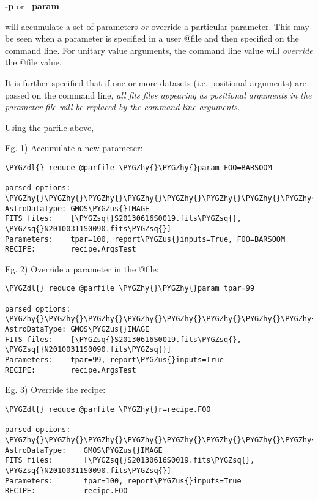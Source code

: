 \documentclass[letterpaper,10pt,english]{sphinxmanual}
\def\PYGZus{\char`\_}
\def\PYGZdl{\char`\$}
\def\PYGZhy{\char`\-}
\def\PYGZsq{\char`\'}
\begin{document}
\textbf{-p} or \textbf{--param}

will accumulate a set of parameters \emph{or} override a particular parameter.
This may be seen when a parameter is specified in a user @file and then
specified on the command line. For unitary value arguments, the command line
value will \emph{override} the @file value.

It is further specified that if one or more datasets (i.e. positional arguments)
are passed on the command line, \emph{all fits files appearing as positional arguments}
\emph{in the parameter file will be replaced by the command line arguments.}

Using the parfile above,

Eg. 1)  Accumulate a new parameter:

\begin{Verbatim}[commandchars=\\\{\}]
\PYGZdl{} reduce @parfile \PYGZhy{}\PYGZhy{}param FOO=BARSOOM

parsed options:
\PYGZhy{}\PYGZhy{}\PYGZhy{}\PYGZhy{}\PYGZhy{}\PYGZhy{}\PYGZhy{}\PYGZhy{}\PYGZhy{}\PYGZhy{}\PYGZhy{}\PYGZhy{}\PYGZhy{}\PYGZhy{}\PYGZhy{}\PYGZhy{}\PYGZhy{}\PYGZhy{}\PYGZhy{}\PYGZhy{}
AstroDataType: GMOS\PYGZus{}IMAGE
FITS files:    [\PYGZsq{}S20130616S0019.fits\PYGZsq{}, \PYGZsq{}N20100311S0090.fits\PYGZsq{}]
Parameters:    tpar=100, report\PYGZus{}inputs=True, FOO=BARSOOM
RECIPE:        recipe.ArgsTest
\end{Verbatim}

Eg. 2) Override a parameter in the @file:

\begin{Verbatim}[commandchars=\\\{\}]
\PYGZdl{} reduce @parfile \PYGZhy{}\PYGZhy{}param tpar=99

parsed options:
\PYGZhy{}\PYGZhy{}\PYGZhy{}\PYGZhy{}\PYGZhy{}\PYGZhy{}\PYGZhy{}\PYGZhy{}\PYGZhy{}\PYGZhy{}\PYGZhy{}\PYGZhy{}\PYGZhy{}\PYGZhy{}\PYGZhy{}\PYGZhy{}\PYGZhy{}\PYGZhy{}\PYGZhy{}\PYGZhy{}
AstroDataType: GMOS\PYGZus{}IMAGE
FITS files:    [\PYGZsq{}S20130616S0019.fits\PYGZsq{}, \PYGZsq{}N20100311S0090.fits\PYGZsq{}]
Parameters:    tpar=99, report\PYGZus{}inputs=True
RECIPE:        recipe.ArgsTest
\end{Verbatim}

Eg. 3) Override the recipe:

\begin{Verbatim}[commandchars=\\\{\}]
\PYGZdl{} reduce @parfile \PYGZhy{}r=recipe.FOO

parsed options:
\PYGZhy{}\PYGZhy{}\PYGZhy{}\PYGZhy{}\PYGZhy{}\PYGZhy{}\PYGZhy{}\PYGZhy{}\PYGZhy{}\PYGZhy{}\PYGZhy{}\PYGZhy{}\PYGZhy{}\PYGZhy{}\PYGZhy{}\PYGZhy{}\PYGZhy{}\PYGZhy{}\PYGZhy{}\PYGZhy{}
AstroDataType:    GMOS\PYGZus{}IMAGE
FITS files:       [\PYGZsq{}S20130616S0019.fits\PYGZsq{}, \PYGZsq{}N20100311S0090.fits\PYGZsq{}]
Parameters:       tpar=100, report\PYGZus{}inputs=True
RECIPE:           recipe.FOO
\end{Verbatim}
\end{document}
